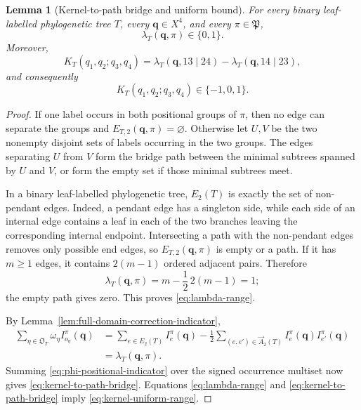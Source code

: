 \documentclass[11pt]{article}
\newtheorem{lemma}[theorem]{Lemma}
\begin{document}
\begin{lemma}[Kernel-to-path bridge and uniform bound]
\label{lem:kernel-to-path-bridge}
For every binary leaf-labelled phylogenetic tree $T$, every
$\boldsymbol q\in X^4$, and every $\pi\in\mathfrak P$,
\begin{equation}\label{eq:lambda-range}
 \lambda_T(\boldsymbol q,\pi)\in\{0,1\}.
\end{equation}
Moreover,
\begin{equation}\label{eq:kernel-to-path-bridge}
 K_T(q_1,q_2;q_3,q_4)
 =\lambda_T(\boldsymbol q,13\mid24)
  -\lambda_T(\boldsymbol q,14\mid23),
\end{equation}
and consequently
\begin{equation}\label{eq:kernel-uniform-range}
 K_T(q_1,q_2;q_3,q_4)\in\{-1,0,1\}.
\end{equation}
\end{lemma}

\begin{proof}
If one label occurs in both positional groups of $\pi$, then no edge can
separate the groups and $E_{T,2}(\boldsymbol q,\pi)=\varnothing$.  Otherwise
let $U,V$ be the two nonempty disjoint sets of labels occurring in the two
groups.  The edges separating $U$ from $V$ form the bridge path between the
minimal subtrees spanned by $U$ and $V$, or form the empty set if those
minimal subtrees meet.

In a binary leaf-labelled phylogenetic tree, $E_2(T)$ is exactly the set of
non-pendant edges.  Indeed, a pendant edge has a singleton side, while each
side of an internal edge contains a leaf in each of the two branches leaving
the corresponding internal endpoint.  Intersecting a path with the
non-pendant edges removes only possible end edges, so
$E_{T,2}(\boldsymbol q,\pi)$ is empty or a path.  If it has $m\ge1$ edges,
it contains $2(m-1)$ ordered adjacent pairs.  Therefore
\[
 \lambda_T(\boldsymbol q,\pi)
 =m-\frac12\,2(m-1)=1;
\]
the empty path gives zero.  This proves \eqref{eq:lambda-range}.

By Lemma~\ref{lem:full-domain-correction-indicator},
\begin{align*}
\sum_{\eta\in\mathfrak O_T}
 \omega_\eta I_{o_\eta}^\pi(\boldsymbol q)
&=\sum_{e\in E_2(T)}I_e^\pi(\boldsymbol q)
-\frac12\sum_{(e,e')\in\overrightarrow A_2(T)}
 I_e^\pi(\boldsymbol q)I_{e'}^\pi(\boldsymbol q)\\
&=\lambda_T(\boldsymbol q,\pi).
\end{align*}
Summing \eqref{eq:phi-positional-indicator} over the signed occurrence
multiset now gives \eqref{eq:kernel-to-path-bridge}.  Equations
\eqref{eq:lambda-range} and \eqref{eq:kernel-to-path-bridge} imply
\eqref{eq:kernel-uniform-range}.
\end{proof}
\end{document}
